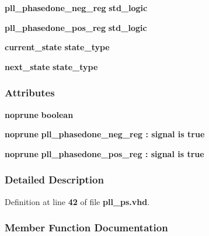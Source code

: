 \begin{DoxyCompactItemize}
\item 
{\bf pll\+\_\+phasedone\+\_\+neg\+\_\+reg} {\bfseries \textcolor{comment}{std\+\_\+logic}\textcolor{vhdlchar}{ }} 
\item 
{\bf pll\+\_\+phasedone\+\_\+pos\+\_\+reg} {\bfseries \textcolor{comment}{std\+\_\+logic}\textcolor{vhdlchar}{ }} 
\item 
{\bf current\+\_\+state} {\bfseries {\bfseries {\bf state\+\_\+type}} \textcolor{vhdlchar}{ }} 
\item 
{\bf next\+\_\+state} {\bfseries {\bfseries {\bf state\+\_\+type}} \textcolor{vhdlchar}{ }} 
\end{DoxyCompactItemize}
\subsubsection*{Attributes}
 \begin{DoxyCompactItemize}
\item 
{\bf noprune} {\bfseries \textcolor{comment}{boolean}\textcolor{vhdlchar}{ }} 
\item 
{\bf noprune} {\bfseries {\bfseries {\bf pll\+\_\+phasedone\+\_\+neg\+\_\+reg}} \textcolor{vhdlchar}{ }\textcolor{vhdlchar}{\+:}\textcolor{vhdlchar}{ }\textcolor{keywordflow}{signal}\textcolor{vhdlchar}{ }\textcolor{keywordflow}{is}\textcolor{vhdlchar}{ }\textcolor{vhdlchar}{ }\textcolor{vhdlchar}{ }\textcolor{vhdlchar}{ }\textcolor{vhdlchar}{true}\textcolor{vhdlchar}{ }} 
\item 
{\bf noprune} {\bfseries {\bfseries {\bf pll\+\_\+phasedone\+\_\+pos\+\_\+reg}} \textcolor{vhdlchar}{ }\textcolor{vhdlchar}{\+:}\textcolor{vhdlchar}{ }\textcolor{keywordflow}{signal}\textcolor{vhdlchar}{ }\textcolor{keywordflow}{is}\textcolor{vhdlchar}{ }\textcolor{vhdlchar}{ }\textcolor{vhdlchar}{ }\textcolor{vhdlchar}{ }\textcolor{vhdlchar}{true}\textcolor{vhdlchar}{ }} 
\end{DoxyCompactItemize}


\subsubsection{Detailed Description}


Definition at line {\bf 42} of file {\bf pll\+\_\+ps.\+vhd}.



\subsubsection{Member Function Documentation}
